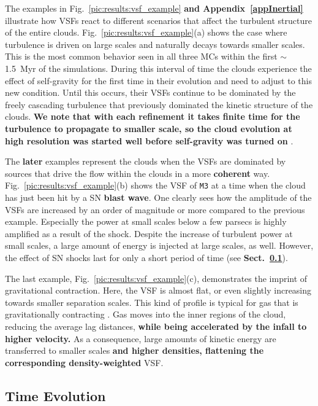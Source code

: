 The examples in Fig.~\ref{pic:results:vsf_example} \textbf{and Appendix~\ref{appInertial}} illustrate how VSFs react to different scenarios that affect the turbulent structure of the entire clouds. 
Fig.~\ref{pic:results:vsf_example}(a) shows the case where turbulence is driven on large scales and naturally decays towards smaller scales.
This is the most common behavior seen in all three MCs within the first $\sim$1.5~Myr of the simulations.
During this interval of time the clouds experience the effect of self-gravity for the first time in their evolution and need to adjust to this new condition.
Until this occurs, their VSFs continue to be dominated by the freely cascading turbulence that previously dominated the kinetic structure of the clouds.
\textbf{We note that with each refinement it takes finite time for the turbulence to propagate to smaller scale, so the cloud evolution at high resolution was started well before self-gravity was turned on}
\citep[see][]{IbanezMejia2017,Seifried2017b}.

The \textbf{later} examples represent the clouds when the VSFs are dominated by sources that drive the flow within the clouds in a more \textbf{coherent} way.
Fig.~\ref{pic:results:vsf_example}(b) shows the VSF of \texttt{M3} at a time when the cloud has just been hit by a SN \textbf{blast wave}. 
One clearly sees how the amplitude of the VSFs are increased by an order of magnitude or more compared to the previous example.
Especially the power at small scales below a few parsecs is highly amplified as a result of the shock.
Despite the increase of turbulent power at small scales, a large amount of energy is injected at large scales, as well.
However, the effect of SN shocks last for only a short period of time (see \textbf{Sect.~\ref{results:normal}}).


The last example, Fig.~\ref{pic:results:vsf_example}(c), demonstrates the imprint of gravitational contraction.
Here, the VSF is almost flat, or even slightly increasing towards smaller separation scales. 
This kind of profile is typical for gas that is gravitationally contracting \citep{Boneberg2015,Burkhart2015}.
Gas moves into the inner regions of the cloud, reducing the average lag distances, \textbf{while being accelerated by the infall to higher velocity.}
As a consequence, large amounts of kinetic energy are transferred to smaller scales \textbf {and higher densities, flattening the corresponding density-weighted} VSF.

\subsection{Time Evolution}\label{results:normal}

